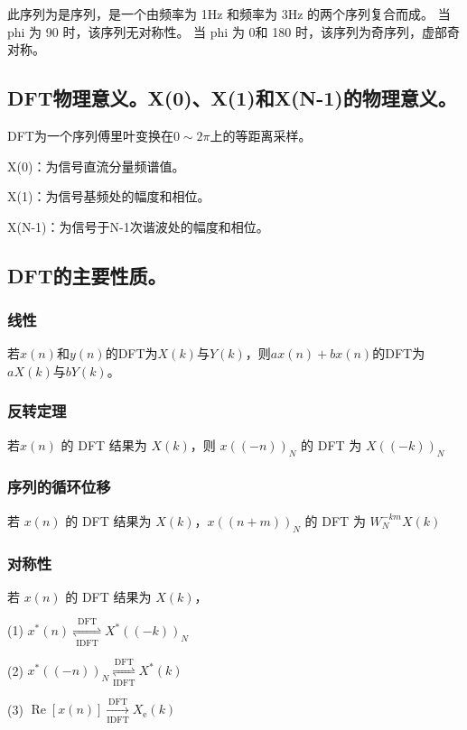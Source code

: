 \documentclass{../source/Experiment}
\begin{document}
            此序列为是序列，是一个由频率为 1Hz 和频率为 3Hz 的两个序列复合而成。
            当 phi 为 90 时，该序列无对称性。
            当 phi 为 0和 180 时，该序列为奇序列，虚部奇对称。
        \subsection{DFT物理意义。X(0)、X(1)和X(N-1)的物理意义。}
        
        DFT为一个序列傅里叶变换在$0 \sim 2\pi$上的等距离采样。

        X(0)：为信号直流分量频谱值。

        X(1)：为信号基频处的幅度和相位。

        X(N-1)：为信号于N-1次谐波处的幅度和相位。

        \subsection{DFT的主要性质。}
            \subsubsection{线性}
            若$x(n)$和$y(n)$的DFT为$X(k)$与$Y(k)$，则$ax(n)+bx(n)$的DFT为$aX(k)$与$bY(k)$。
            \subsubsection{反转定理}
            若$x(n)$ 的 DFT 结果为 $X(k)$，则 $x((-n))_N$ 的 DFT 为 $X((-k))_N$
            \subsubsection{序列的循环位移}

            若 $x(n)$ 的 DFT 结果为 $X(k)$，$x((n + m))_N$ 的 DFT 为 $W_{N}^{-k m} X(k)$
            \subsubsection{对称性}
            若 $x(n)$ 的 DFT 结果为 $X(k)$，
            
            (1) $x^{*}(n) \underset{\text { IDFT }}{\stackrel{\text { DFT }}{\rightleftharpoons}} X^{*}((-k))_{N}$

            (2) $x^{*}((-n))_{N} \underset{\mathrm{IDFT}}{\stackrel{\mathrm{DFT}}{\rightleftharpoons}} X^{*}(k)$

            (3) $\operatorname{Re}[x(n)] \underset{\mathrm{IDFT}}{\stackrel{\mathrm{DFT}}{\longrightarrow}} X_{\mathrm{e}}(k)$
\end{document}
